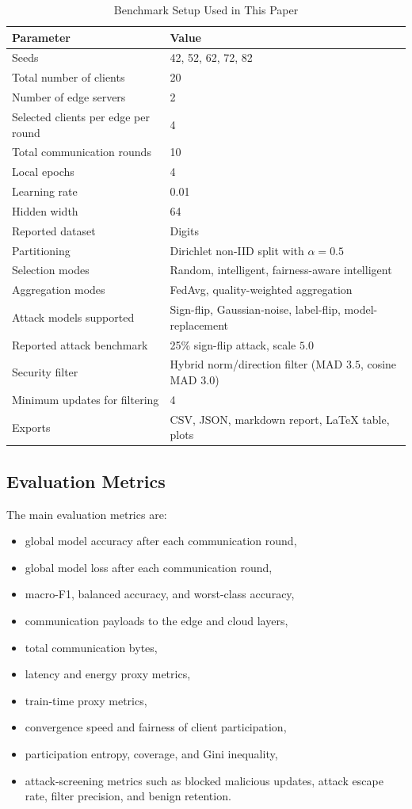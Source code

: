 \documentclass[conference]{IEEEtran}
\begin{document}
\begin{table}[t]
\caption{Benchmark Setup Used in This Paper}
\label{tab:setup}
\centering
\small
\begin{tabular}{>{\raggedright\arraybackslash}p{3.2cm}p{4.7cm}}
\toprule
\textbf{Parameter} & \textbf{Value} \\
\midrule
Seeds & 42, 52, 62, 72, 82 \\
Total number of clients & 20 \\
Number of edge servers & 2 \\
Selected clients per edge per round & 4 \\
Total communication rounds & 10 \\
Local epochs & 4 \\
Learning rate & 0.01 \\
Hidden width & 64 \\
Reported dataset & Digits \\
Partitioning & Dirichlet non-IID split with $\alpha = 0.5$ \\
Selection modes & Random, intelligent, fairness-aware intelligent \\
Aggregation modes & FedAvg, quality-weighted aggregation \\
Attack models supported & Sign-flip, Gaussian-noise, label-flip, model-replacement \\
Reported attack benchmark & 25\% sign-flip attack, scale $5.0$ \\
Security filter & Hybrid norm/direction filter (MAD $3.5$, cosine MAD $3.0$) \\
Minimum updates for filtering & 4 \\
Exports & CSV, JSON, markdown report, \LaTeX{} table, plots \\
\bottomrule
\end{tabular}
\end{table}

\subsection{Evaluation Metrics}
The main evaluation metrics are:
\begin{itemize}
    \item global model accuracy after each communication round,
    \item global model loss after each communication round,
    \item macro-F1, balanced accuracy, and worst-class accuracy,
    \item communication payloads to the edge and cloud layers,
    \item total communication bytes,
    \item latency and energy proxy metrics,
    \item train-time proxy metrics,
    \item convergence speed and fairness of client participation,
    \item participation entropy, coverage, and Gini inequality,
    \item attack-screening metrics such as blocked malicious updates, attack escape rate, filter precision, and benign retention.
\end{itemize}
\end{document}
